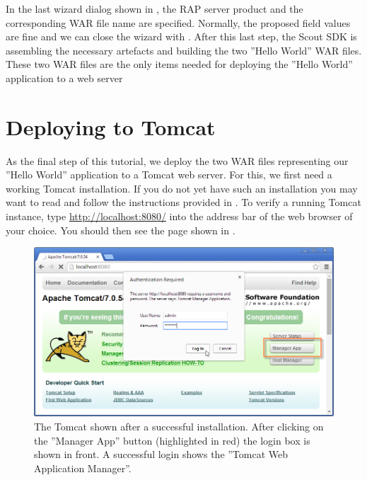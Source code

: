 \documentclass[a4paper,10pt,twoside]{book}
\begin{document}
In the last wizard dialog shown in , the RAP server product and the corresponding WAR file name are specified.
Normally, the proposed field values are fine and we can close the wizard with .
After this last step, the Scout SDK is assembling the necessary artefacts and building the two ''Hello World'' WAR files.
These two WAR files are the only items needed for deploying the ''Hello World'' application to a web server

\section{Deploying to Tomcat}

As the final step of this tutorial, we deploy the two WAR files representing our ''Hello World'' application to a Tomcat web server.
For this, we first need a working Tomcat installation.
If you do not yet have such an installation you may want to read and follow the instructions provided in .
To verify a running Tomcat instance, type \url{http://localhost:8080/} into the address bar of the web browser of your choice.
You should then see the page shown in .

\begin{figure}
\includegraphics[width=15cm]{tomcat_managerapp_login.png} 
\caption{The Tomcat shown after a successful installation. 
After clicking on the ''Manager App'' button (highlighted in red) the login box is shown in front.
A successful login shows the ''Tomcat Web Application Manager''.}
\end{figure}
\end{document}
